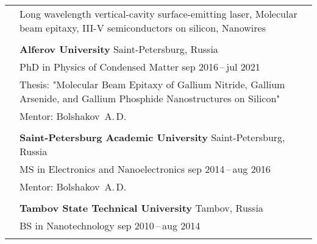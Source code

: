 \documentclass[letterpaper, 11pt]{article}
\begin{document}
	\begin{longtable}{p{1.3in}p{4.8in}}
		
		
		\nohyphens{\color{OliveGreen}{Research interests}}
        & Long wavelength vertical-cavity surface-emitting laser, Molecular
        beam epitaxy, III-V semiconductors on silicon, Nanowires \\
		& \\
		
		
		\color{OliveGreen}{Education}
        & \textbf{Alferov University} \hfill Saint-Petersburg, Russia \\
		& PhD in Physics of Condensed Matter \hfill sep 2016\,--\,jul 2021 \\
        & Thesis: "Molecular Beam Epitaxy of Gallium Nitride, Gallium Arsenide,
        and Gallium Phosphide Nanostructures on Silicon" \\
		& Mentor: Bolshakov~A.\,D.\\
		& \\
		
		& \textbf{Saint-Petersburg Academic University} \hfill Saint-Petersburg, Russia \\
		& MS in Electronics and Nanoelectronics \hfill sep 2014\,--\,aug 2016\\
		& Mentor: Bolshakov~A.\,D. \\
		& \\
		
		& \textbf{Tambov State Technical University} \hfill Tambov, Russia\\
		& BS in Nanotechnology \hfill sep 2010\,--\,aug 2014\\
		& \\
		
		
		

\end{longtable}
\end{document}
